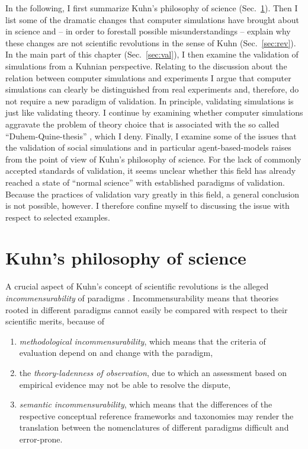 \documentclass[12pt, a4paper]{article}
\begin{document}
In the following, I first summarize Kuhn's philosophy of science
(Sec.~\ref{sec:kuhn}). Then I list some of the dramatic changes that
computer simulations have brought about in science and -- in order to
forestall possible misunderstandings -- explain why these changes are
not scientific revolutions in the sense of Kuhn (Sec.~\ref{sec:rev}).
In the main part of this chapter (Sec.~\ref{sec:val}), I then examine
the validation of simulations from a Kuhnian perspective. Relating to
the discussion about the relation between computer simulations and
experiments I argue that computer simulations can clearly be
distinguished from real experiments and, therefore, do not require a
new paradigm of validation. In principle, validating simulations is
just like validating theory. I continue by examining whether computer
simulations aggravate the problem of theory choice that is associated
with the so called ``Duhem-Quine-thesis'' \citep{harding:1976}, which
I deny. Finally, I examine some of the issues that the validation of
social simulations and in particular agent-based-models raises from
the point of view of Kuhn's philosophy of science. For the lack of
commonly accepted standards of validation, it seems unclear whether
this field has already reached a state of ``normal science'' with
established paradigms of validation. Because the practices of
validation vary greatly in this field, a general conclusion is not
possible, however. I therefore confine myself to discussing the issue
with respect to selected examples.

\section{Kuhn's philosophy of science}

\label{sec:kuhn}

A crucial aspect of Kuhn's concept of scientific revolutions is the
alleged {\em incommensurability} of paradigms \citep[ch. 12,
postscript 5.]{kuhn:1976} \citep[ch. 2]{sismondo:2007} \citep[sec.
4.3f.]{bird:2013}. Incommensurability means that theories rooted in
different paradigms cannot easily be compared with respect to their
scientific merits, because of

\begin{enumerate}

  \item {\em methodological incommensurability}, which means that the
    criteria of evaluation depend on and change with the paradigm,
  \item the {\em theory-ladenness of observation}, due to which an
    assessment based on empirical evidence may not be able to resolve
    the dispute,
  \item {\em semantic incommensurability}, which means that the
    differences of the respective conceptual reference frameworks and
    taxonomies may render the translation between the nomenclatures of
    different paradigms difficult and error-prone.

\end{enumerate}
\end{document}
